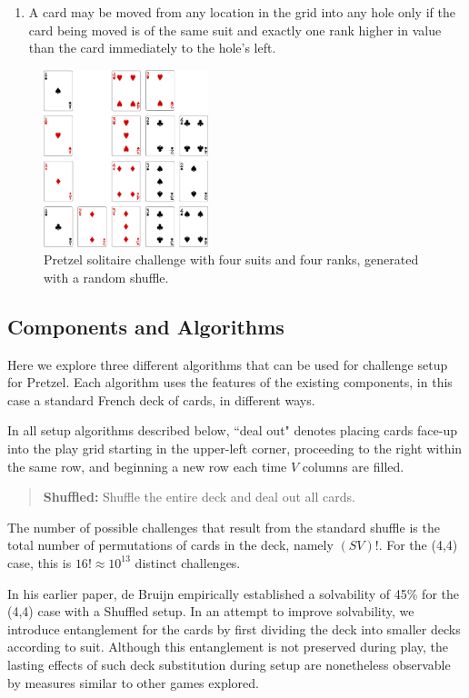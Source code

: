 \documentclass[journal]{IEEEtran}
\begin{document}
\begin{enumerate}
    \item A card may be moved from any location in the grid into any hole only if the card being moved is of the same suit and exactly one rank higher in value than the card immediately to the hole's left.
\end{enumerate}

\begin{figure}[t]
\centering
\includegraphics[width=4.8cm]{pretzelbasic.png}
\caption{Pretzel solitaire challenge with four suits and four ranks, generated with a random shuffle.}
\label{fig:pretzelbasic}
\end{figure}

\subsection{Components and Algorithms}
Here we explore three different algorithms that can be used for challenge setup for Pretzel. Each algorithm uses the features of the existing components, in this case a standard French deck of cards, in different ways. 

In all setup algorithms described below, ``deal out" denotes placing cards face-up into the play grid starting in the upper-left corner, proceeding to the right within the same row, and beginning a new row each time $V$ columns are filled.

\begin{quote}
    {\bf Shuffled:} Shuffle the entire deck and deal out all cards.
\end{quote}

The number of possible challenges that result from the standard shuffle is the total number of permutations of cards in the deck, namely $(SV)!$. For the (4,4) case, this is $16! \approx 10^{13}$ distinct challenges.

In his earlier paper, de Bruijn empirically established a solvability of 45\% for the (4,4) case with a Shuffled setup. In an attempt to improve solvability, we introduce entanglement for the cards by first dividing the deck into smaller decks according to suit. Although this entanglement is not preserved during play, the lasting effects of such deck substitution during setup are nonetheless observable by measures similar to other games explored.
\end{document}
